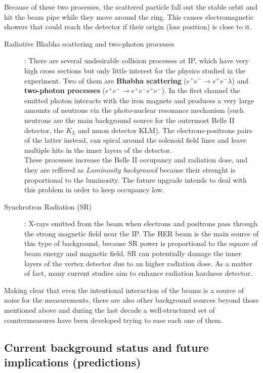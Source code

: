 Because of these two processes, the scattered particle fall out the stable orbit and hit the beam pipe while they move around the ring. This causes electromagnetic showers that could reach the detector if their origin (loss position) is close to it.


\begin{description}
\item[Radiative Bhabha scattering and two-photon processes]:
	There are several undesirable collision processes at IP, which have very high cross sections but only little interest for the physics studied in the experiment. Two of them are \textbf{Bhabha scattering} ($e^{+}e^{-} \rightarrow e^{+}e^{-} \lambda$) and \textbf{two-photon processes} ($e^{+}e^{-} \rightarrow e^{+}e^{-}e^{+}e^{-} $). 
	In the first channel the emitted photon interacts with the iron magnets and produces a very large amounts of neutrons via the photo-nuclear resonance mechanism (such neutrons are the main background source for the outermost Belle II detector, the $K_{L}$ and muon detector KLM). The electrons-positrons pairs of the latter instead, can spiral around the solenoid field lines and leave multiple hits in the inner layers of the detector.\\
	
These processes increase the Belle II occupancy and radiation dose, and they are reffered as \textit{Luminosity background} because their strenght is proportional to the luminosity. The future upgrade intends to deal with this problem in order to keep occupancy low.

\item[Synchrotron Radiation (SR)]:
	X-rays emitted from the beam when electrons and positrons pass through the strong magnetic field near the IP. The HER beam is the main source of this type of background, because SR power is proportional to the square of beam energy and magnetic field.
SR can potentially damage the inner layers of the vertex detector due to an higher radiation dose. As a matter of fact, many current studies aim to enhance radiation hardness detector.
\end{description}

Making clear that even the intentional interaction of the beams is a source of noise for the measurements, there are also other background sources beyond those mentioned above and during the last decade a well-structured set of countermeasures have been developed trying to ease each one of them.


\subsection{Current background status and future implications (predictions)}

